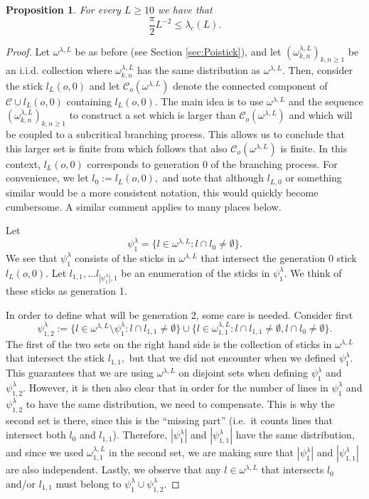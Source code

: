 \documentclass[a4paper,12pt]{article}
\newcommand{\CC}{{\mathcal{C}}}
\newtheorem{proposition}[theorem]{Proposition}
\begin{document}
\begin{proposition} \label{prop:lambdaclowerbound}
For every $L\geq 10$ we have that
\[
\frac{\pi}{2} L^{-2} \leq  \lambda_c(L).
\]
\end{proposition}
\begin{proof}
Let $\omega^{\lambda,L}$ be as before (see Section \ref{sec:Poistick}), and let 
$(\omega^{\lambda,L}_{k,n})_{k,n\geq 1}$ be an i.i.d. collection where 
$\omega^{\lambda,L}_{k,n}$ has the same distribution as $\omega^{\lambda,L}.$
Then, consider the stick $l_L(o,0)$ and let 
$\CC_o(\omega^{\lambda,L})$ denote the connected component of $\CC\cup l_L(o,0)$ 
containing $l_L(o,0).$
The main idea is to use $\omega^{\lambda,L}$ and the sequence 
$(\omega^{\lambda,L}_{k,n})_{k,n\geq 1}$ to 
construct a set which is larger than $\CC_o(\omega^{\lambda,L})$ and which will  
be coupled to a subcritical branching process. This allows us to conclude that 
this larger set is finite from which follows that
also $\CC_o(\omega^{\lambda,L})$ is finite.
In this context, $l_{L}(o,0)$ corresponds to generation 0 of the branching process.
For convenience, we let $l_0:=l_L(o,0),$ and note that although $l_{L,0}$ or 
something similar would be a more consistent notation, this would quickly 
become cumbersome. A similar comment applies to many places below.


Let 
\[
\psi^\lambda_1=\{l\in \omega^{\lambda,L}: l \cap l_0 \neq \emptyset\}.
\]
We see that $\psi^{\lambda}_1$ consists of the sticks in $\omega^{\lambda,L}$
that intersect the generation 0 stick $l_{L}(o,0)$. Let $l_{1,1},\ldots 
l_{|\psi^{\lambda}_1|,1}$ be an enumeration of the sticks in $\psi^\lambda_1.$
We think of these sticks as generation 1. 

In order to define what will be generation 2, some care is needed. Consider first
\[
\psi^{\lambda}_{1,2}
:=\{l\in \omega^{\lambda,L} \setminus \psi^\lambda_1 : l \cap l_{1,1} \neq \emptyset \}
\cup \{l\in \omega^{\lambda,L}_{1,1}: l \cap l_{1,1}\neq \emptyset, 
l \cap l_0\neq \emptyset\}.
\]
The first of the two sets on the right hand side is the collection of sticks
in $\omega^{\lambda,L}$ that intersect the stick $l_{1,1},$
but that we did not encounter when we defined $\psi^\lambda_1.$ This guarantees that 
we are using $\omega^{\lambda,L}$ on disjoint sets when defining $\psi^\lambda_1$
and $\psi^\lambda_{1,2}.$ However, it is then also clear that in order for the 
number of lines in $\psi^\lambda_1$ and $\psi^\lambda_{1,2}$ to have the same 
distribution, we need to compensate. This is why the second set is there, since this 
is the ``missing part'' (i.e.\ it counts lines that intersect both $l_0$ and 
$l_{1,1}$). Therefore, $|\psi^\lambda_1|$ and $|\psi^{\lambda}_{1,1}|$ have the same 
distribution, and since we used $\omega^{\lambda,L}_{1,1}$ in the second set,
we are making sure that $|\psi^\lambda_1|$ and $|\psi^{\lambda}_{1,1}|$
are also independent. Lastly, we observe that any $l\in \omega^{\lambda,L}$
that intersects $l_0$ and/or $l_{1,1}$ must belong to 
$\psi^\lambda_1 \cup \psi^\lambda_{1,2}.$ 


\end{proof}
\end{document}
